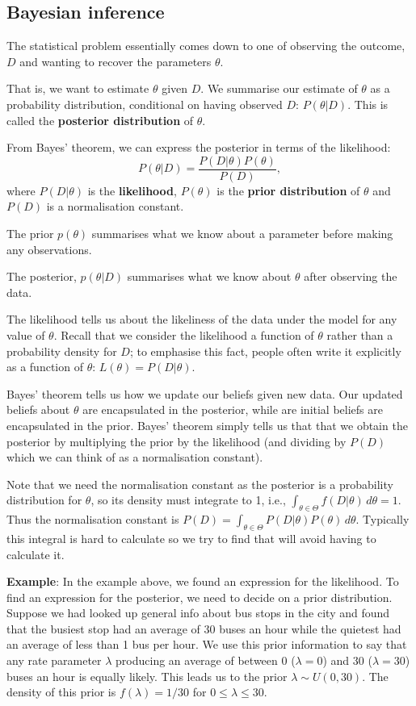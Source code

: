 \documentclass[11pt]{article}
\begin{document}
\subsection{Bayesian inference}

The statistical problem essentially comes down to one of observing the outcome, $D$ and wanting to recover the parameters $\theta$.  

That is, we want to estimate $\theta$ given $D$. We summarise our estimate of $\theta $ as a probability distribution, conditional on having observed $D$:    $P(\theta|D)$. This is called the {\bf posterior distribution} of $\theta$.  



From Bayes' theorem, we can express the posterior in terms of the likelihood:
\[ P(\theta|D) = \frac {P(D|\theta) P(\theta)}{P(D)}, \]
where $P(D|\theta)$ is the {\bf likelihood}, $P(\theta)$ is the {\bf prior distribution} of $\theta$ and $P(D)$ is a normalisation constant.

The prior $p(\theta)$ summarises what we know about a parameter before making any observations.

The posterior, $p(\theta | D)$ summarises what we know about $\theta$ after observing the data.

The likelihood tells us about the likeliness of the data under the model for any value of $\theta$. Recall that we consider the likelihood  a function of $\theta$ rather than a probability density for $D$; to emphasise this fact, people often write it explicitly as a function of $\theta$: $L(\theta) = P(D|\theta)$.

Bayes' theorem tells us how we update our beliefs given new data.  Our updated beliefs about $\theta$ are encapsulated in the posterior, while are initial beliefs are encapsulated in the prior.  Bayes' theorem simply tells us that that we obtain the posterior by multiplying the prior by the likelihood (and dividing by $P(D)$ which we can think of as a normalisation constant). 

Note that we need the normalisation constant as the posterior is a probability distribution for $\theta$, so its density must integrate to 1, i.e.,  $\int_{\theta \in \Theta} f(D|\theta) \, d\theta = 1$.  Thus the normalisation constant is $P(D) = \int_{\theta \in \Theta}  P(D|\theta) P(\theta) \, d\theta$. Typically this integral is hard to calculate so we try to find that will avoid having to calculate it.


{\bf Example}: In the example above, we found an expression for the likelihood.  To find an expression for the posterior, we need to decide on a prior distribution.  Suppose we had looked up general info about bus stops in the city and found that the busiest stop had an average of  30 buses an hour while the quietest had an average of less than 1 bus per hour.  We use  this prior information to say that any rate parameter $\lambda$ producing an average of between 0 ($\lambda = 0$) and 30  ($\lambda = 30$) buses an hour is equally likely.  This leads us to the prior $\lambda \sim U(0,30)$.  The density of this prior is $f(\lambda) = 1/30$ for $0 \leq \lambda \leq 30$.
\end{document}
